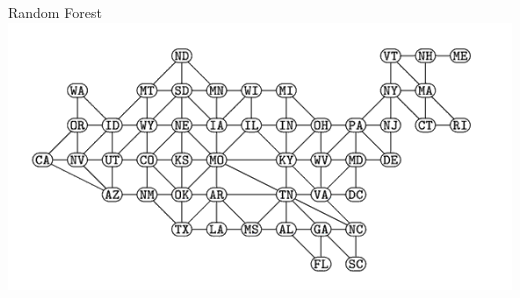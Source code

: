 \documentclass{beamer}
\begin{document}
\begin{frame}{Random Forest}
    \centering
    \includegraphics[scale = .3]{contiguous-usa-graph}
    
\end{frame}
\end{document}
